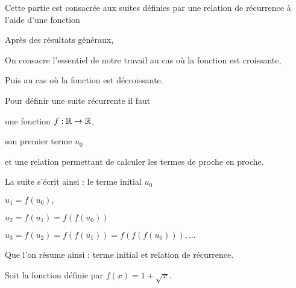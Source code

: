 







\debuttexte


\diapo

\change

\change

Cette partie est consacrée aux suites définies par une relation de récurrence
à l'aide d'une fonction

Après des résultats généraux,

\change

On consacre l'essentiel de notre travail au cas où la fonction est croissante,

\change

Puis au cas où la fonction est décroissante.



\diapo

Pour définir une suite récurrente il faut 

\change

une fonction $f : \mathbb{R} \to \mathbb{R}$,

\change

son premier terme $u_0$

\change

et une relation permettant de calculer les termes de proche en proche.

\change

La suite s'écrit ainsi :
le terme initial $u_0$ 

\change

$u_1 = f(u_0),$

\change

$u_2 = f(u_1) =f(f(u_0))$

\change

$u_3 = f(u_2)=f(f(u_1)) =f(f(f(u_0))),\ldots$

\change

Que l'on résume ainsi :
terme initial et relation de récurrence.

\change



Soit la fonction définie par $f(x)=1+\sqrt{x}$. 

\change

